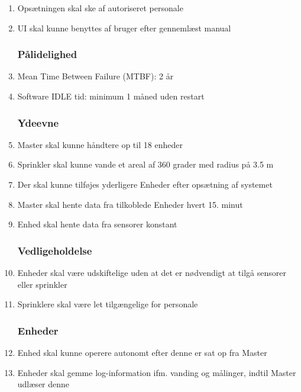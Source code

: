 \begin{enumerate}

\subsubsection*{Brugbarhed}
\item Opsætningen skal ske af autoriseret personale
\item UI skal kunne benyttes af bruger efter gennemlæst manual


\subsubsection*{Pålidelighed}
\item Mean Time Between Failure (MTBF): 2 år
\item Software IDLE tid: minimum 1 måned uden restart


\subsubsection*{Ydeevne}
\item Master skal kunne håndtere op til 18 enheder
\item Sprinkler skal kunne vande et areal af 360 grader med radius på 3.5 m 
\item Der skal kunne tilføjes yderligere Enheder efter opsætning af systemet
\item Master skal hente data fra tilkoblede Enheder hvert 15. minut
\item Enhed skal hente data fra sensorer konstant


\subsubsection*{Vedligeholdelse}
\item Enheder skal være udskiftelige uden at det er nødvendigt at tilgå sensorer eller sprinkler
\item Sprinklere skal være let tilgængelige for personale


\subsubsection*{Enheder}
\item Enhed skal kunne operere autonomt efter denne er sat op fra Master
\item Enheder skal gemme log-information ifm. vanding og målinger, indtil Master udlæser denne

\end{enumerate}

